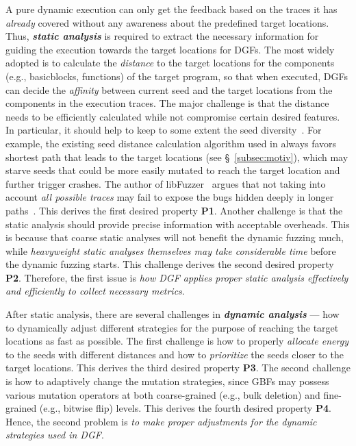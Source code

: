 A pure dynamic execution can only get the feedback based on the traces it has \emph{already} covered without any awareness about the predefined target locations.
Thus, \textbf{\emph{static analysis}} is required to extract the necessary information for guiding the execution towards the target locations for DGFs. The most widely adopted is to calculate the \emph{distance} to the target locations for the components (e.g., basicblocks, functions) of the target program, so that when executed, DGFs can decide the \emph{affinity} between current seed and the target locations from the components in the execution traces. 
The major challenge is that the distance needs to be efficiently calculated while not compromise certain desired features.
In particular, it should help to keep to some extent the seed diversity~\cite{Audibert09}.
For example, the existing seed distance calculation algorithm used in \aflgo always favors shortest path that leads to the target locations (see \S~\ref{subsec:motiv}), which may starve seeds that could be more easily mutated to reach the target location and further trigger crashes.
The author of libFuzzer~\cite{libfuzzer} argues that not taking into account \emph{all possible traces} may fail to expose the bugs hidden deeply in longer paths~\cite{kcc_aflgo}.
This derives the first desired property \textbf{P1}.
Another challenge is that the static analysis should provide precise information with acceptable overheads.
This is because that coarse static analyses will not benefit the dynamic fuzzing much, while \emph{heavyweight static analyses themselves may take considerable time} before the dynamic fuzzing starts.
This challenge derives the second desired property \textbf{P2}.
Therefore, the first issue is \emph{how DGF applies proper static analysis effectively and efficiently to collect necessary metrics}.

After static analysis, there are several  challenges in \textbf{\emph{dynamic analysis}} --- how to dynamically adjust different strategies for the purpose of reaching the target locations as fast as possible.
The first challenge is how to properly \emph{allocate energy} to the seeds with different distances and how to \emph{prioritize} the seeds closer to the target locations.
This derives the third desired property \textbf{P3}.
The second challenge is how to adaptively change the mutation strategies, since GBFs may possess various mutation operators at both coarse-grained (e.g., bulk deletion) and fine-grained (e.g., bitwise flip) levels.
 This derives the fourth desired property \textbf{P4}.
Hence, the second problem is \emph{to make proper adjustments for the dynamic strategies used in DGF}.


